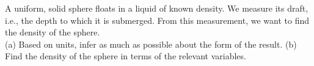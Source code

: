 A uniform, solid sphere floats in a liquid of known density. We measure
its draft, i.e., the depth to which it is submerged.
From this measurement, we want to find the density of the sphere.\\
%
(a) Based on units, infer as much as possible about the
form of the result.\hwendpart
%
(b) Find the density of the sphere in terms of the relevant variables.\answercheck
